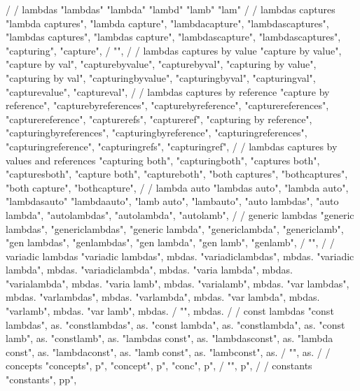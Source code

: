         /
        / lambdas
        "lambdas"
        "lambda"
        "lambd"
        "lamb"
        "lam"
        /
        / lambdas captures
        "lambda captures",  
        "lambda capture",  
        "lambdacapture",  
        "lambdascaptures",  
        "lambdas captures",  
        "lambdas capture",  
        "lambdascapture",  
        "lambdascaptures",  
        "capturing",  
        "capture",  
        / {"", 
        /
        / lambdas captures by value
        "capture by value",  
        "capture by val",  
        "capturebyvalue",  
        "capturebyval",  
        "capturing by value",  
        "capturing by val",  
        "capturingbyvalue",  
        "capturingbyval",  
        "capturingval",  
        "capturevalue",  
        "captureval",  
        /
        / lambdas captures by reference 
        "capture by reference",  
        "capturebyreferences",  
        "capturebyreference",  
        "capturereferences",  
        "capturereference",  
        "capturerefs",  
        "captureref",  
        "capturing by reference",  
        "capturingbyreferences",  
        "capturingbyreference",  
        "capturingreferences",  
        "capturingreference",  
        "capturingrefs",  
        "capturingref",  
        /
        / lambdas captures by values and references 
        "capturing both",  
        "capturingboth",  
        "captures both",  
        "capturesboth",  
        "capture both",  
        "captureboth",  
        "both captures",  
        "bothcaptures",  
        "both capture",  
        "bothcapture",  
        /
        / lambda auto
        "lambdas auto",
        "lambda auto",
        "lambdasauto"
        "lambdaauto",
        "lamb auto",
        "lambauto",
        "auto lambdas",
        "auto lambda",
        "autolambdas",
        "autolambda",
        "autolamb",
        /
        / generic lambdas
        "generic lambdas",  
        "genericlambdas",  
        "generic lambda",  
        "genericlambda",  
        "genericlamb",  
        "gen lambdas",  
        "genlambdas",  
        "gen lambda",  
        "gen lamb",  
        "genlamb",  
        / {"", 
        /
        / variadic lambdas 
        "variadic lambdas", mbdas. 
        "variadiclambdas", mbdas. 
        "variadic lambda", mbdas. 
        "variadiclambda", mbdas. 
        "varia lambda", mbdas. 
        "varialambda", mbdas. 
        "varia lamb", mbdas. 
        "varialamb", mbdas. 
        "var lambdas", mbdas. 
        "varlambdas", mbdas. 
        "varlambda", mbdas. 
        "var lambda", mbdas. 
        "varlamb", mbdas. 
        "var lamb", mbdas. 
        / {"", mbdas.
        /
        / const lambdas 
        "const lambdas", as. 
        "constlambdas", as. 
        "const lambda", as. 
        "constlambda", as. 
        "const lamb", as. 
        "constlamb", as. 
        "lambdas const", as. 
        "lambdasconst", as. 
        "lambda const", as. 
        "lambdaconst", as. 
        "lamb const", as. 
        "lambconst", as. 
        / {"", as.
        /
        / concepts 
        "concepts", p"}, 
        "concept", p"}, 
        "conc", p"}, 
        / {"", p"},
        /
        / constants 
        "constants", pp"}, 
